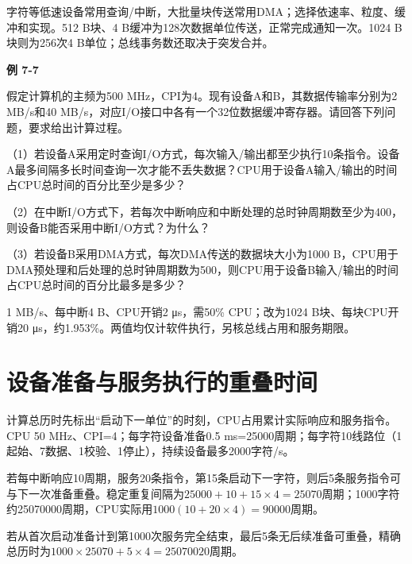 字符等低速设备常用查询/中断，大批量块传送常用DMA；选择依速率、粒度、缓冲和实现。512 B块、4 B缓冲为128次数据单位传送，正常完成通知一次。1024 B块则为256次4 B单位；总线事务数还取决于突发合并。

\par\medskip{}\noindent\hypertarget{CO07-E07}{}\label{CO07-E07}\textbf{例 7-7}\par\nobreak\smallskip

假定计算机的主频为500 MHz，CPI为4。现有设备A和B，其数据传输率分别为2 MB/s和40 MB/s，对应I/O接口中各有一个32位数据缓冲寄存器。请回答下列问题，要求给出计算过程。

（1）若设备A采用定时查询I/O方式，每次输入/输出都至少执行10条指令。设备A最多间隔多长时间查询一次才能不丢失数据？CPU用于设备A输入/输出的时间占CPU总时间的百分比至少是多少？

（2）在中断I/O方式下，若每次中断响应和中断处理的总时钟周期数至少为400，则设备B能否采用中断I/O方式？为什么？

（3）若设备B采用DMA方式，每次DMA传送的数据块大小为1000 B，CPU用于DMA预处理和后处理的总时钟周期数为500，则CPU用于设备B输入/输出的时间占CPU总时间的百分比最多是多少？

1 MB/s、每中断4 B、CPU开销2 μs，需50\% CPU；改为1024 B块、每块CPU开销20 μs，约1.953\%。两值均仅计软件执行，另核总线占用和服务期限。

\section{设备准备与服务执行的重叠时间}\label{CO07-overlap}

计算总历时先标出``启动下一单位''的时刻，CPU占用累计实际响应和服务指令。CPU 50 MHz、CPI=4；每字符设备准备0.5 ms=25000周期；每字符10线路位（1起始、7数据、1校验、1停止），持续设备最多2000字符/s。

若每中断响应10周期，服务20条指令，第15条启动下一字符，则后5条服务指令可与下一次准备重叠。稳定重复间隔为\(25000+10+15\times4=25070\)周期；1000字符约25070000周期，CPU实际用\(1000(10+20\times4)=90000\)周期。

若从首次启动准备计到第1000次服务完全结束，最后5条无后续准备可重叠，精确总历时为\(1000\times25070+5\times4=25070020\)周期。
